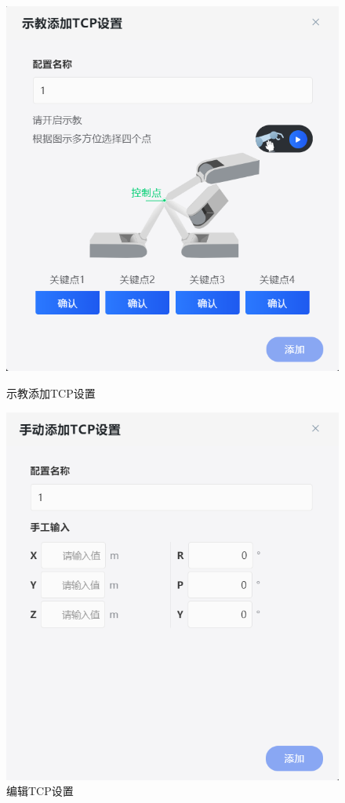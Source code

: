 \begin{figure}[htb]
	\centering
	\begin{minipage}[t]{0.48\linewidth}
		\centering
		\includegraphics[width=\linewidth]{screen/3-24.png}
		\caption{示教添加TCP设置}
		\label{fig:示教添加TCP设置}
	\end{minipage}
	\hfill
	\begin{minipage}[t]{0.48\linewidth}
		\centering
		\includegraphics[width=\linewidth]{screen/3-25.png}
		\caption{编辑TCP设置}
		\label{fig:编辑TCP设置}
	\end{minipage}
\end{figure}

